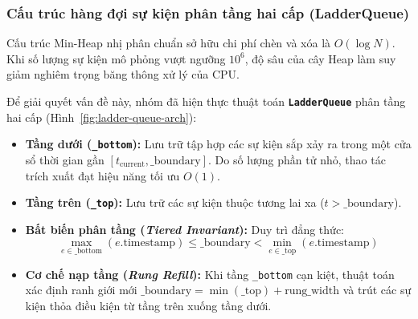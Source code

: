 \newpage
\subsubsection{Cấu trúc hàng đợi sự kiện phân tầng hai cấp (LadderQueue)}
\label{subsubsec:ladder-queue}

\hspace{0.5cm}Cấu trúc Min-Heap nhị phân chuẩn sở hữu chi phí chèn và xóa là $O(\log N)$. Khi số lượng sự kiện mô phỏng vượt ngưỡng $10^6$, độ sâu của cây Heap làm suy giảm nghiêm trọng băng thông xử lý của CPU.

Để giải quyết vấn đề này, nhóm đã hiện thực thuật toán \textbf{\texttt{LadderQueue}} phân tầng hai cấp (Hình~\ref{fig:ladder-queue-arch}):
\begin{itemize}[leftmargin=1.5em, itemsep=3pt]
\item \textbf{Tầng dưới (\texttt{\_bottom}):} Lưu trữ tập hợp các sự kiện sắp xảy ra trong một cửa sổ thời gian gần $[t_{\text{current}}, \text{\_boundary}]$. Do số lượng phần tử nhỏ, thao tác trích xuất đạt hiệu năng tối ưu $O(1)$.
\item \textbf{Tầng trên (\texttt{\_top}):} Lưu trữ các sự kiện thuộc tương lai xa ($t > \text{\_boundary}$).
\item \textbf{Bất biến phân tầng (\textit{Tiered Invariant}):} Duy trì đẳng thức:
\begin{equation}
\max_{e \in \text{\_bottom}} (e.\text{timestamp}) \le \text{\_boundary} < \min_{e \in \text{\_top}} (e.\text{timestamp})
\end{equation}
\item \textbf{Cơ chế nạp tầng (\textit{Rung Refill}):} Khi tầng \texttt{\_bottom} cạn kiệt, thuật toán xác định ranh giới mới $\text{\_boundary} = \min(\text{\_top}) + \text{rung\_width}$ và trút các sự kiện thỏa điều kiện từ tầng trên xuống tầng dưới.
\end{itemize}

